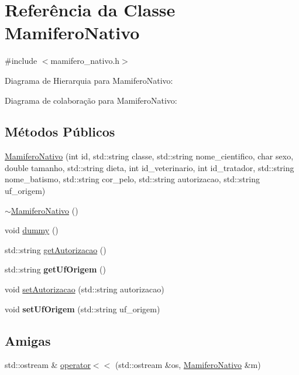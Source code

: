 \hypertarget{classMamiferoNativo}{}\section{Referência da Classe Mamifero\+Nativo}
\label{classMamiferoNativo}


{\ttfamily \#include $<$mamifero\+\_\+nativo.\+h$>$}



Diagrama de Hierarquia para Mamifero\+Nativo\+:


Diagrama de colaboração para Mamifero\+Nativo\+:
\subsection*{Métodos Públicos}
\begin{DoxyCompactItemize}
\item 
\hyperlink{classMamiferoNativo_a9cea805fd23290d730d8c320ac8075bd}{Mamifero\+Nativo} (int id, std\+::string classe, std\+::string nome\+\_\+cientifico, char sexo, double tamanho, std\+::string dieta, int id\+\_\+veterinario, int id\+\_\+tratador, std\+::string nome\+\_\+batismo, std\+::string cor\+\_\+pelo, std\+::string autorizacao, std\+::string uf\+\_\+origem)
\item 
\hyperlink{classMamiferoNativo_aa08f523498d6713873a29747024e5717}{$\sim$\+Mamifero\+Nativo} ()
\item 
void \hyperlink{classMamiferoNativo_a79092135d515ffb00c24dcc8bc073acc}{dummy} ()
\item 
std\+::string \hyperlink{classMamiferoNativo_aefe966dd3616bfbc201131eaf711b9eb}{get\+Autorizacao} ()
\item 
\mbox{\label{classMamiferoNativo_aab0b41134e5fb59a55052fc526f0a8d5}} 
std\+::string {\bfseries get\+Uf\+Origem} ()
\item 
void \hyperlink{classMamiferoNativo_a9435be8d270a3f066bd873bbb3066753}{set\+Autorizacao} (std\+::string autorizacao)
\item 
\mbox{\label{classMamiferoNativo_a50a9e23e37807bbd65bebeb5d83991b7}} 
void {\bfseries set\+Uf\+Origem} (std\+::string uf\+\_\+origem)
\end{DoxyCompactItemize}
\subsection*{Amigas}
\begin{DoxyCompactItemize}
\item 
std\+::ostream \& \hyperlink{classMamiferoNativo_a563bbb0977b08a10ba7273aa5cee79c4}{operator$<$$<$} (std\+::ostream \&os, \hyperlink{classMamiferoNativo}{Mamifero\+Nativo} \&m)
\end{DoxyCompactItemize}
